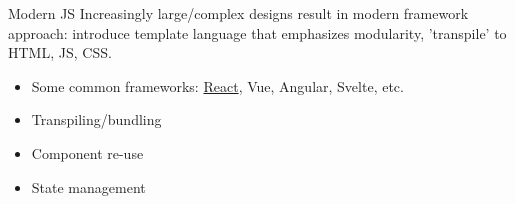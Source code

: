 \documentclass[10pt]{beamer}
\begin{document}

\begin{frame}{Modern JS}
    Increasingly large/complex designs result in modern framework approach: introduce template language that emphasizes modularity, 'transpile' to HTML, JS, CSS.

    \begin{itemize}
        \item Some common frameworks: \underline{React}, Vue, Angular, Svelte, etc.
        \item Transpiling/bundling
        \item Component re-use
        \item State management
    \end{itemize}
\end{frame}
\end{document}
